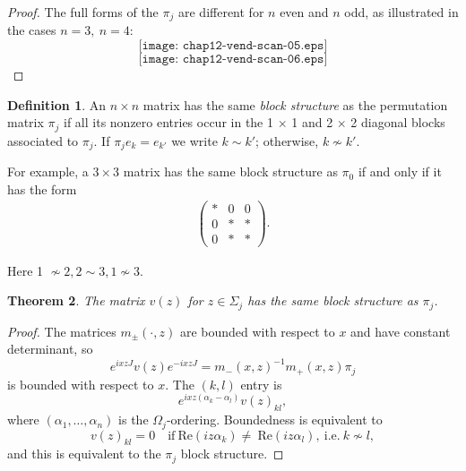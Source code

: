 \documentclass{surv-l}
\theoremstyle{plain}
\newtheorem{theorem}{Theorem}[section]
\theoremstyle{definition}
\newtheorem{definition}[theorem]{Definition}
\numberwithin{equation}{chapter}
\begin{document}
\begin{proof}
The full forms of the $\pi_{j}$ are different for $n$ even and $n$ odd, as illustrated in the cases $n=3,\ n =4$:
\begin{equation*}
\tag{12.9}
\texttt{[image: chap12-vend-scan-05.eps]}
\end{equation*}
\begin{equation*}
\tag{12.10}
\texttt{[image: chap12-vend-scan-06.eps]}
\end{equation*}
\end{proof}
\setcounter{theorem}{10}
\begin{definition}\label{defi12.11}
An $n\times n$ matrix has the same \emph{block structure} as the permutation matrix $\pi_{j}$ if all its nonzero entries occur in the 1 $\times$ 1 and 2 $\times$ 2 diagonal blocks associated to $\pi_{j}$. If $\pi_{j}e_{k}=e_{k'}$ we write $k\sim k'$; otherwise, $k\nsim k'$.

For example, a $3\times 3$ matrix has the same block structure as $\pi_{0}$ if and only if it has the form
\begin{align*}
\left(\begin{array}{ccc}
 \ast & 0 & 0\\
 0 & \ast & \ast\\
 0 & \ast & \ast
\end{array}\right).
\end{align*}

Here 1 $\nsim 2, 2\sim 3, 1\nsim 3$.
\end{definition}

\begin{theorem}\label{thm12.12}
The matrix $v(z)$ for $z\in\Sigma_{j}$ has the same block structure as $\pi_{j}$.
\end{theorem}
\begin{proof}
The matrices $m_{\pm}(\cdot, z)$ are bounded with respect to $x$ and have constant determinant, so
\begin{equation*}
e^{ixzJ}v(z)e^{-ixzJ}=m_{-}(x, z)^{-1}m_{+}(x, z)\pi_{j}
\end{equation*}
is bounded with respect to $x$. The $(k, l)$ entry is
\begin{equation*}
e^{ixz(\alpha_{k}-\alpha_{l})}v(z)_{kl},
\end{equation*}
where $(\alpha_{1},\ldots, \alpha_{n})$ is the $\Omega_{j}$-ordering. Boundedness is equivalent to
\begin{equation*}
v(z)_{kl}=0\quad \mathrm{if}\ \mathrm{Re}(iz\alpha_{k})\neq\ \mathrm{Re}(iz\alpha_{l}),\ \mathrm{i.e.}\ k\nsim l,
\end{equation*}
and this is equivalent to the $\pi_{j}$ block structure.
\end{proof}
\end{document}
